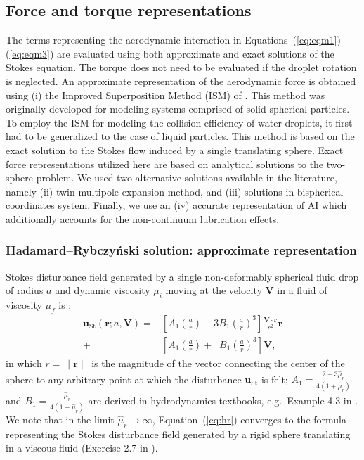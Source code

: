 \documentclass[../thesis.tex]{subfiles}
\begin{document}
\subsection{Force and torque representations}

The terms representing the aerodynamic interaction in Equations~(\ref{eq:eqm1})--(\ref{eq:eqm3}) are evaluated using both approximate and exact solutions of the Stokes equation. The torque does not need to be evaluated if the droplet rotation is neglected. An approximate representation of the aerodynamic force is obtained using (i) the Improved Superposition Method (ISM) of \cite{WAG05}. This method was originally developed for modeling systems comprised of solid spherical particles. To employ the ISM for modeling the collision efficiency of water droplets, it first had to be generalized to the case of liquid particles. This method is based on the exact solution to the Stokes flow induced by a single translating sphere. Exact force representations utilized here are based on analytical solutions to the two-sphere problem. We used two alternative solutions available in the literature, namely (ii) twin multipole expansion method, and (iii) solutions in bispherical coordinates system. Finally, we use an (iv) accurate representation of AI which additionally accounts for the non-continuum lubrication effects.

\subsubsection{Hadamard--Rybczy{\'n}ski solution: approximate representation\label{sec:hr}}
Stokes disturbance field generated by a single non-deformably spherical fluid drop of radius $a$ and dynamic viscosity $\mu_i$ moving at the velocity $\boldsymbol{V}$ in a fluid of viscosity $\mu_f$  is \citep{H11,R11}:
\begin{align}
\boldsymbol{u}_\text{St}(\boldsymbol{r};a,\boldsymbol{V}) = &\left[A_1 \left(\frac{a}{r}\right) - 3B_1 \left(\frac{a}{r}\right)^3 \right] \frac{\boldsymbol{V \cdot r}}{r^2} \boldsymbol{r} \nonumber\\
+ &\left[A_1 \left(\frac{a}{r}\right) + \;\; B_1 \left(\frac{a}{r}\right)^3 \right] \boldsymbol{V},
\label{eq:hr}
\end{align}
in which $r = \|\boldsymbol{r}\|$ is the magnitude of the vector connecting the center of the sphere to any arbitrary point at which the disturbance $\boldsymbol{u}_\text{St}$ is felt; $A_1 = \tfrac{2+3\hat{\mu}_r}{4(1+\hat{\mu}_r)}$ and $B_1 = \tfrac{\hat{\mu}_r}{4(1+\hat{\mu}_r)}$ are derived in hydrodynamics textbooks, e.g.\ Example 4.3 in \cite{KK13}. We note that in the limit $\hat{\mu}_r\to\infty$, Equation~(\ref{eq:hr}) converges to the formula representing the Stokes disturbance field generated by a rigid sphere translating in a viscous fluid (Exercise 2.7 in \cite{KK13}).
\end{document}
